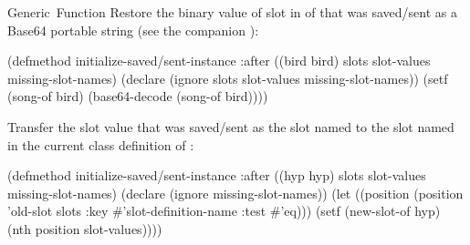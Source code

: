 \documentclass[10pt,twoside,english,pdftex]{article}
\begin{document}
\begin{functiondoc}{Generic~Function}
\fnexamples
\label{ex:song-read}
%
Restore the binary value of slot  in  of
 that was saved/sent as a Base64 portable string (see the companion
):
%
\W\supp
\begin{example}
  (defmethod initialize-saved/sent-instance :after ((bird bird)
                                                    slots slot-values 
                                                    missing-slot-names)
    (declare (ignore slots slot-values missing-slot-names))
    (setf (song-of bird) (base64-decode (song-of bird))))
\end{example}
%
Transfer the slot value that was saved/sent as the slot named
 to the slot named  in the current
class definition of :
%
\W\supp\notpretop
\begin{example}
  (defmethod initialize-saved/sent-instance :after ((hyp hyp)
                                                    slots slot-values 
                                                    missing-slot-names)
    (declare (ignore missing-slot-names))
    (let ((position (position 'old-slot slots 
                              :key #'slot-definition-name
                              :test #'eq)))
       (setf (new-slot-of hyp) (nth position slot-values))))
\end{example}

\end{functiondoc}

\end{document}
